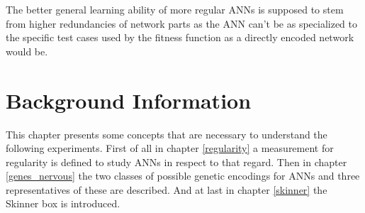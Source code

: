 \documentclass[12pt,twoside]{article}
\theoremstyle{plain}
\theoremstyle{definition}
\theoremstyle{remark}
\begin{document}
The better general learning ability of more regular ANNs is supposed to stem from higher redundancies of network parts as the ANN can't be as specialized to the specific test cases used by the fitness function as a directly encoded network would be.


\section{Background Information}
\label{sec:background}
This chapter presents some concepts that are necessary to understand the following experiments.
First of all in chapter \ref{regularity} a measurement for regularity is defined to study ANNs in respect to that regard.
Then in chapter \ref{genes_nervous} the two classes of possible genetic encodings for ANNs and three representatives of these are described.
And at last in chapter \ref{skinner} the Skinner box is introduced.

\end{document}
